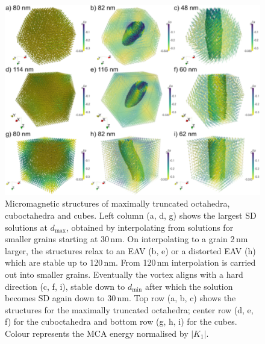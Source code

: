 \documentclass[review,authoryear]{elsarticle}
\newcommand{\dmax}{d_\text{max}}
\newcommand{\dmin}{d_\text{min}}
\newcommand{\nm}{\,\text{nm}}
\begin{document}
\begin{figure}[ht]
\centering
\includegraphics[width=\textwidth]{Figure_05.pdf}
\caption{Micromagnetic structures of maximally truncated octahedra, cuboctahedra and cubes. Left column (a, d, g) shows the largest SD solutions at $\dmax$, obtained by interpolating from solutions for smaller grains starting at 30$\nm$. On interpolating to a grain 2$\nm$ larger, the structures relax to an EAV (b, e) or a distorted EAV (h) which are stable up to 120$\nm$. From 120$\nm$ interpolation is carried out into smaller grains. Eventually the vortex aligns with a hard direction (c, f, i), stable down to $\dmin$ after which the solution becomes SD again down to 30$\nm$. Top row (a, b, c) shows the structures for the maximally truncated octahedra; center row (d, e, f) for the cuboctahedra and bottom row (g, h, i) for the cubes. Colour represents the MCA energy normalised by $|K_1|$.}
\label{fig5}
\end{figure}
\end{document}
